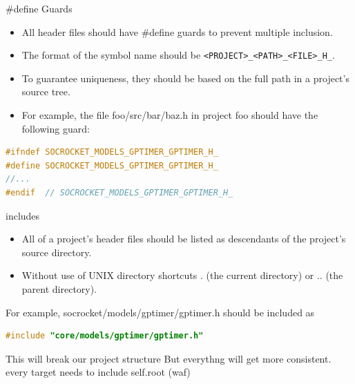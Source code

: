 \documentclass[fleqn,11pt,aspectratio=43]{beamer}
\begin{document}
\begin{frame}[fragile]{\#define Guards}
\begin{itemize}
  \item All header files should have \#define guards to prevent multiple inclusion.
  \item The format of the symbol name should be {\tt <PROJECT>\_<PATH>\_<FILE>\_H\_}.
  \item To guarantee uniqueness, they should be based on the full path in a project's source tree. 
  \item For example, the file foo/src/bar/baz.h in project foo should have the following guard:
\end{itemize}

\begin{lstlisting}[language=c]
#ifndef SOCROCKET_MODELS_GPTIMER_GPTIMER_H_
#define SOCROCKET_MODELS_GPTIMER_GPTIMER_H_
//...
#endif  // SOCROCKET_MODELS_GPTIMER_GPTIMER_H_
\end{lstlisting}
\end{frame}

\begin{frame}[fragile]{includes}
  \begin{itemize}
    \item All of a project's header files should be listed as descendants of the project's source directory.
    \item Without use of UNIX directory shortcuts . (the current directory) or .. (the parent directory). 
  \end{itemize}

For example, socrocket/models/gptimer/gptimer.h should be included as

\begin{lstlisting}[language=c]
#include "core/models/gptimer/gptimer.h"
\end{lstlisting}

  \begin{alertblock}{This will break our project structure}
    But everythng will get more consistent. \\
    every target needs to include self.root (waf)
  \end{alertblock}
\end{frame}
\end{document}
